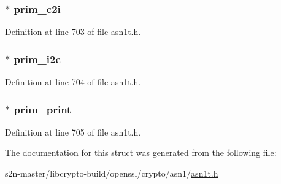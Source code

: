 \subsubsection[{\texorpdfstring{prim\+\_\+c2i}{prim_c2i}}]{ $\ast$ prim\+\_\+c2i}\hypertarget{struct_a_s_n1___p_r_i_m_i_t_i_v_e___f_u_n_c_s__st_a73fb772fd3d8f5fa636a7e25f0ea9729}{}\label{struct_a_s_n1___p_r_i_m_i_t_i_v_e___f_u_n_c_s__st_a73fb772fd3d8f5fa636a7e25f0ea9729}


Definition at line 703 of file asn1t.\+h.

\subsubsection[{\texorpdfstring{prim\+\_\+i2c}{prim_i2c}}]{ $\ast$ prim\+\_\+i2c}\hypertarget{struct_a_s_n1___p_r_i_m_i_t_i_v_e___f_u_n_c_s__st_a26aec35fb58eb2be36be66175cdf6201}{}\label{struct_a_s_n1___p_r_i_m_i_t_i_v_e___f_u_n_c_s__st_a26aec35fb58eb2be36be66175cdf6201}


Definition at line 704 of file asn1t.\+h.

\subsubsection[{\texorpdfstring{prim\+\_\+print}{prim_print}}]{ $\ast$ prim\+\_\+print}\hypertarget{struct_a_s_n1___p_r_i_m_i_t_i_v_e___f_u_n_c_s__st_ac0f755b191c802a8f7742ea76f15d96b}{}\label{struct_a_s_n1___p_r_i_m_i_t_i_v_e___f_u_n_c_s__st_ac0f755b191c802a8f7742ea76f15d96b}


Definition at line 705 of file asn1t.\+h.



The documentation for this struct was generated from the following file\+:\begin{DoxyCompactItemize}
\item 
s2n-\/master/libcrypto-\/build/openssl/crypto/asn1/\hyperlink{crypto_2asn1_2asn1t_8h}{asn1t.\+h}\end{DoxyCompactItemize}
